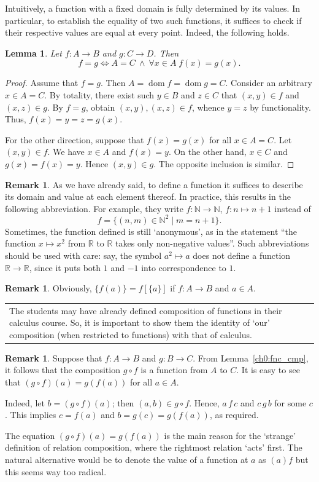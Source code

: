 \documentclass[12pt,notitlepage]{article}
\theoremstyle{plain}
\newtheorem{lemma}[thm]{Lemma}
\theoremstyle{definition}
\newtheorem{rem}[thm]{Remark}
\theoremstyle{plain}
\newcommand{\N}{\mathbb{N}}
\newcommand{\R}{\mathbb{R}}
\newcommand{\dom}{\mathop{\mathrm{dom}}}
\newcommand{\1}{\mathbf{1}}
\newcommand{\0}{\mathbf{0}}
\newcommand{\mcomm}[1]{
\medskip\noindent\begin{tabular}{| l}
\parbox{0.99\textwidth}{{\small
#1 }}\end{tabular}
\smallskip}
\begin{document}
Intuitively, a function with a fixed domain is fully determined by its values. In particular, to establish the equality of two such functions, it suffices to check if their respective values are equal at every point. Indeed, the following holds.
\begin{lemma}\label{ch0:tot_fnc_cmp}
Let $f\colon A \to B$ and $g\colon C \to D$. Then
$$f = g \iff A = C\ \wedge\ \forall x \in A\; f(x) = g(x).$$
\end{lemma}
\begin{proof}
Assume that $f = g$. Then $A = \dom f = \dom g = C$. Consider an arbitrary $x \in A = C$. By totality, there exist such $y \in B$ and $z \in C$ that $(x,y) \in f$ and $(x,z) \in g$. By $f = g$, obtain $(x, y), (x, z) \in f$, whence $y = z$ by functionality. Thus, $f(x) = y = z = g(x)$.

For the other direction, suppose that $f(x) = g(x)$ for all $x \in A = C$. Let $(x,y) \in f$. We have $x \in A$ and $f(x) = y$. On the other hand, $x \in C$ and $g(x) = f(x) = y$. Hence $(x,y) \in g$. The opposite inclusion is similar.
\end{proof}

\begin{rem}
As we have already said, to define a function it suffices to describe its domain and value at each element thereof. In practice, this results in the following abbreviation. For example, they write $f\colon \N \to \N$, $f\colon n \mapsto n + 1$ instead of
$$f = \{(n,m) \in \N^2 \mid m = n + 1 \}.$$
Sometimes, the function defined is still `anonymous', as in the statement ``the function $x \mapsto x^2$ from $\R$ to $\R$ takes only non-negative values''. Such abbreviations should be used with care: say, the symbol  $a^2 \mapsto a$ does not define a function $\R \to \R$, since it puts both $1$ and $-1$ into correspondence to $1$. 
\end{rem}

\begin{rem}
Obviously,  $\{f(a)\} = f[\{a\}]$ if $f\colon A \to B$ and $a \in A$.
\end{rem}

\mcomm{The students may have already defined composition of functions in their calculus course. So, it is important to show them the identity of `our' composition (when restricted to functions) with that of calculus.}
\begin{rem}
Suppose that $f\colon A \to B$ and $g\colon B \to C$. From Lemma~\ref{ch0:fnc_cmp}, it follows that the composition $g \circ f$ is a function from $A$ to $C$. It is easy to see that $(g\circ f)(a) = g(f(a))$ for all $a \in A$.

Indeed, let $b = (g \circ f)(a)$; then $(a, b) \in g \circ f$. Hence, $a\, f\, c$ and $c\, g\, b$ for some $c$. This implies $c = f(a)$ and $b = g(c) = g (f(a))$, as required.

The equation $(g\circ f)(a) = g(f(a))$ is the main reason for the `strange' definition of relation composition, where the rightmost relation `acts' first. The natural alternative would be to denote the value of a function at $a$ as $(a)f$ but this seems way too radical.
\end{rem}
\end{document}
